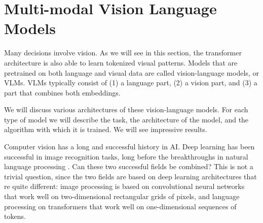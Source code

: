 \section{Multi-modal Vision Language Models}\label{sec:vlm}

Many decisions involve vision.
As we will see in this section, %
the transformer architecture is also able to learn tokenized visual patterns. Models that are   pretrained on  both language and visual data are called  vision-language models, or VLMs. VLMs typically consist of (1) a language part, (2) a vision part, and (3) a part that combines both embeddings.  %

We will discuss various architectures of these vision-language models. For each type of model we will describe the task, the architecture of the model, and the algorithm with which it is trained. 
We will see impressive results.

Computer vision has a long and successful history in AI.  Deep learning has  been successful in image recognition
tasks, long before the breakthroughs in natural language 
processing \citep{krizhevsky2012imagenet}. Can these two successful fields be combined? This is not a trivial question, since the two fields are based on deep learning architectures that re quite different: image processing is based on convolutional neural networks that work well on two-dimensional rectangular grids of pixels, and language processing on transformers that work well on one-dimensional sequences of tokens. 


